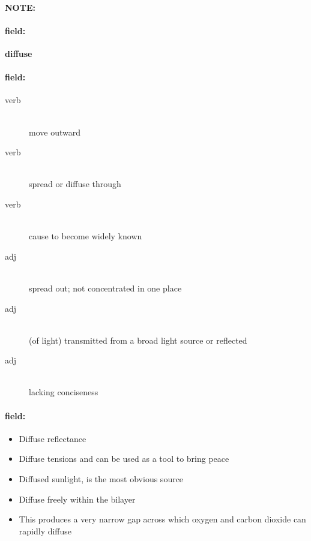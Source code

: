 \documentclass[12pt]{article}
\newenvironment{note}{\paragraph{NOTE:}}{}
\newenvironment{field}{\paragraph{field:}}{}
\begin{document}
\begin{note}
\begin{field}
\textbf{\large diffuse}
\end{field}


\begin{field}
\begin{description}
\item[verb] \hfill \\ 
move outward

\item[verb] \hfill \\ 
spread or diffuse through

\item[verb] \hfill \\ 
cause to become widely known

\item[adj] \hfill \\ 
spread out; not concentrated in one place

\item[adj] \hfill \\ 
(of light) transmitted from a broad light source or reflected

\item[adj] \hfill \\ 
lacking conciseness

\end{description}
\end{field}

\begin{field}
\begin{itemize}
\item Diffuse reflectance
\item Diffuse tensions and can be used as a tool to bring peace
\item Diffused sunlight, is the most obvious source
\item Diffuse freely within the bilayer
\item This produces a very narrow gap across which oxygen and carbon dioxide can rapidly diffuse
\end{itemize}
\end{field}
\end{note}
\end{document}
